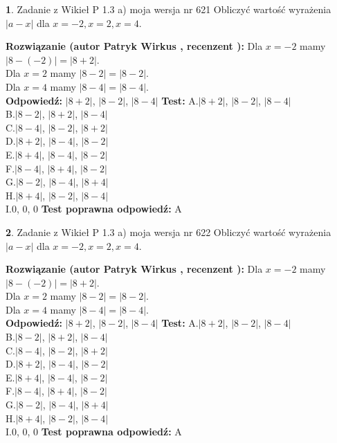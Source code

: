 \documentclass[12pt, a4paper]{article}
\theoremstyle{definition} %
\newtheorem{zad}{}
\newcommand{\zadStart}[1]{\begin{zad}#1\newline}
\newcommand{\zadStop}{\end{zad}}
\newcommand{\rozwStart}[2]{\noindent \textbf{Rozwiązanie (autor #1 , recenzent #2): }\newline}
\newcommand{\rozwStop}{\newline}
\newcommand{\odpStart}{\noindent \textbf{Odpowiedź:}\newline}
\newcommand{\odpStop}{\newline}
\newcommand{\testStart}{\noindent \textbf{Test:}\newline}
\newcommand{\testStop}{\newline}
\newcommand{\kluczStart}{\noindent \textbf{Test poprawna odpowiedź:}\newline}
\newcommand{\kluczStop}{\newline}
\begin{document}
\zadStart{Zadanie z Wikieł P 1.3 a) moja wersja nr 621}
Obliczyć wartość wyrażenia $|a - x|$ dla $x=-2,x=2,x=4$.
\zadStop
\rozwStart{Patryk Wirkus}{}
Dla $x = -2$ mamy $|8 - (-2)| = |8 + 2|$.\\
Dla $x = 2$ mamy $|8 - 2| = |8 - 2|$.\\
Dla $x = 4$ mamy $|8 - 4| = |8 - 4|$.\\
\rozwStop
\odpStart
$|8 + 2|$, $|8 - 2|$, $|8 - 4|$
\odpStop
\testStart
A.$|8 + 2|$, $|8 - 2|$, $|8 - 4|$\\
B.$|8 - 2|$, $|8 + 2|$, $|8 - 4|$\\
C.$|8 - 4|$, $|8 - 2|$, $|8 + 2|$\\
D.$|8 + 2|$, $|8 - 4|$, $|8 - 2|$\\
E.$|8 + 4|$, $|8 - 4|$, $|8 - 2|$\\
F.$|8 - 4|$, $|8 + 4|$, $|8 - 2|$\\
G.$|8 - 2|$, $|8 - 4|$, $|8 + 4|$\\
H.$|8 + 4|$, $|8 - 2|$, $|8 - 4|$\\
I.$0$, $0$, $0$
\testStop
\kluczStart
A
\kluczStop



\zadStart{Zadanie z Wikieł P 1.3 a) moja wersja nr 622}
Obliczyć wartość wyrażenia $|a - x|$ dla $x=-2,x=2,x=4$.
\zadStop
\rozwStart{Patryk Wirkus}{}
Dla $x = -2$ mamy $|8 - (-2)| = |8 + 2|$.\\
Dla $x = 2$ mamy $|8 - 2| = |8 - 2|$.\\
Dla $x = 4$ mamy $|8 - 4| = |8 - 4|$.\\
\rozwStop
\odpStart
$|8 + 2|$, $|8 - 2|$, $|8 - 4|$
\odpStop
\testStart
A.$|8 + 2|$, $|8 - 2|$, $|8 - 4|$\\
B.$|8 - 2|$, $|8 + 2|$, $|8 - 4|$\\
C.$|8 - 4|$, $|8 - 2|$, $|8 + 2|$\\
D.$|8 + 2|$, $|8 - 4|$, $|8 - 2|$\\
E.$|8 + 4|$, $|8 - 4|$, $|8 - 2|$\\
F.$|8 - 4|$, $|8 + 4|$, $|8 - 2|$\\
G.$|8 - 2|$, $|8 - 4|$, $|8 + 4|$\\
H.$|8 + 4|$, $|8 - 2|$, $|8 - 4|$\\
I.$0$, $0$, $0$
\testStop
\kluczStart
A
\kluczStop
\end{document}
